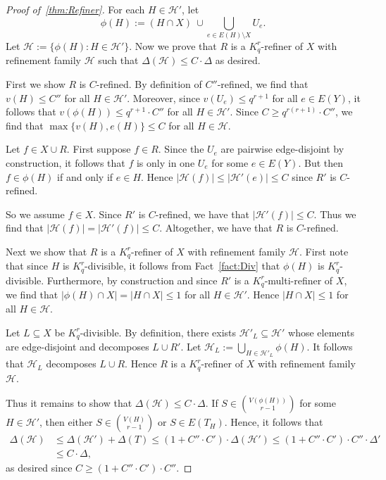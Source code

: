 \documentclass[11pt]{article}
\newcounter{i}
\theoremstyle{plain}
\renewcommand{\theclaim}{\thetheorem.\arabic{claim}}
\newenvironment{lateproof}[1]
 {%
  \renewcommand{\theclaim}{\ref{#1}.\arabic{claim}}%
  \begin{proof}[Proof of~\cref{#1}]%
 }
 {\end{proof}}
\theoremstyle{plain} %
\theoremstyle{definition}
\begin{document}
\begin{lateproof}{thm:Refiner}
For each $H\in\mathcal{H}'$, let $$\phi(H) := (H\cap X) ~\cup \bigcup_{e\in E(H)\setminus X} U_e.$$ Let $\mathcal{H}:= \{\phi(H):H\in\mathcal{H}'\}$. Now we prove that $R$ is a $K_q^r$-refiner of $X$ with refinement family $\mathcal{H}$ such that $\Delta(\mathcal{H})\le C\cdot \Delta$ as desired.

First we show $R$ is $C$-refined. By definition of $C''$-refined, we find that $v(H)\le C''$ for all $H\in\mathcal{H}'$. Moreover, since $v(U_e)\le q^{r+1}$ for all $e\in E(Y)$, it follows that $v(\phi(H)) \le q^{r+1}\cdot C''$ for all $H\in \mathcal{H'}$. Since $C\ge q^{r(r+1)}\cdot C''$, we find that $\max \{v(H),e(H)\} \le C$ for all $H\in\mathcal{H}$. 

Let $f\in X\cup R$. First suppose $f\in R$. Since the $U_e$ are pairwise edge-disjoint by construction, it follows that $f$ is only in one $U_e$ for some $e\in E(Y)$. But then  $f\in \phi(H)$ if and only if $e\in H$. Hence $|\mathcal{H}(f)|\le |\mathcal{H}'(e)| \le C$ since $R'$ is $C$-refined. 

So we assume $f\in X$. Since $R'$ is $C$-refined, we have that $|\mathcal{H}'(f)|\le C$. Thus we find that $|\mathcal{H}(f)|= |\mathcal{H}'(f)|\le C$. Altogether, we have that $R$ is $C$-refined. 

Next we show that $R$ is a $K_q^r$-refiner of $X$ with refinement family $\mathcal{H}$. First note that since $H$ is $K_q^r$-divisible, it follows from Fact~\ref{fact:Div} that $\phi(H)$ is $K_q^r$-divisible. Furthermore, by construction and since $R'$ is a $K_q^r$-multi-refiner of $X$, we find that $|\phi(H)\cap X|=|H\cap X|\le 1$ for all $H\in \mathcal{H}'$. Hence $|H\cap X|\le 1$ for all $H\in \mathcal{H}$.

Let $L\subseteq X$ be $K_q^r$-divisible. By definition, there exists $\mathcal{H}'_L \subseteq \mathcal{H}'$ whose elements are edge-disjoint and decomposes $L\cup R'$. Let $\mathcal{H}_L := \bigcup_{H\in\mathcal{H}'_L} \phi(H)$. It follows that $\mathcal{H}_L$ decomposes $L\cup R$. Hence $R$ is a $K_q^r$-refiner of $X$ with refinement family $\mathcal{H}$. 

Thus it remains to show that $\Delta(\mathcal{H})\le C\cdot \Delta$. If $S \in \binom{V(\phi(H))}{r-1}$ for some $H\in \mathcal{H}'$, then either $S\in \binom{V(H)}{r-1}$ or $S\in E(T_H)$. Hence, it follows that
\begin{align*}
\Delta(\mathcal{H}) &\le \Delta(\mathcal{H}') + \Delta(T) \le (1+C''\cdot C')\cdot \Delta(\mathcal{H}') \le (1+C''\cdot C') \cdot C'' \cdot \Delta'\\
&\le C \cdot \Delta,
\end{align*}
as desired since $C\ge (1+C''\cdot C') \cdot C''$. 
\end{lateproof}
\end{document}
